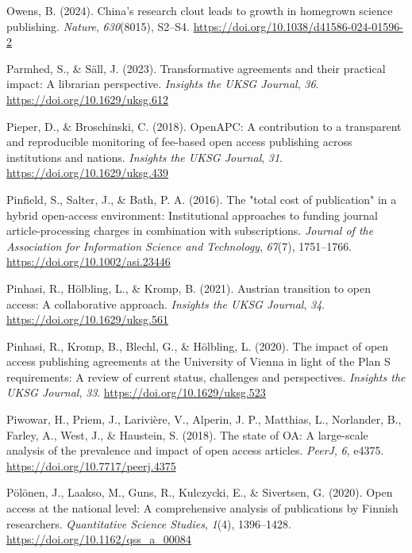 \documentclass[a4paper,man,floatsintext,longtable,noextraspace,12pt]{apa6}
\newlength{\cslhangindent}
\newenvironment{CSLReferences}[2] %
  {\begin{list}{}{%
   \setlength{\itemindent}{0pt}
   \setlength{\leftmargin}{0pt}
   \setlength{\parsep}{0pt}
   \ifodd #1
    \setlength{\leftmargin}{\cslhangindent}
    \setlength{\itemindent}{-1\cslhangindent}
   \fi
   \setlength{\itemsep}{#2\baselineskip}}}
  {\end{list}}
\begin{document}
\begin{CSLReferences}{1}{0}
Owens, B. (2024). China's research clout leads to growth in homegrown
science publishing. \emph{Nature}, \emph{630}(8015), S2--S4.
\url{https://doi.org/10.1038/d41586-024-01596-2}

Parmhed, S., \& Säll, J. (2023). Transformative agreements and their
practical impact: A librarian perspective. \emph{Insights the UKSG
Journal}, \emph{36}. \url{https://doi.org/10.1629/uksg.612}

Pieper, D., \& Broschinski, C. (2018). {OpenAPC}: A contribution to a
transparent and reproducible monitoring of fee-based open access
publishing across institutions and nations. \emph{Insights the {UKSG}
Journal}, \emph{31}. \url{https://doi.org/10.1629/uksg.439}

Pinfield, S., Salter, J., \& Bath, P. A. (2016). The "total cost of
publication" in a hybrid open-access environment: Institutional
approaches to funding journal article-processing charges in combination
with subscriptions. \emph{Journal of the Association for Information
Science and Technology}, \emph{67}(7), 1751--1766.
\url{https://doi.org/10.1002/asi.23446}

Pinhasi, R., Hölbling, L., \& Kromp, B. (2021). Austrian transition to
open access: A collaborative approach. \emph{Insights the UKSG Journal},
\emph{34}. \url{https://doi.org/10.1629/uksg.561}

Pinhasi, R., Kromp, B., Blechl, G., \& Hölbling, L. (2020). The impact
of open access publishing agreements at the {University of Vienna} in
light of the {Plan S} requirements: A review of current status,
challenges and perspectives. \emph{Insights the UKSG Journal},
\emph{33}. \url{https://doi.org/10.1629/uksg.523}

Piwowar, H., Priem, J., Larivière, V., Alperin, J. P., Matthias, L.,
Norlander, B., Farley, A., West, J., \& Haustein, S. (2018). The state
of {OA}: A large-scale analysis of the prevalence and impact of open
access articles. \emph{{PeerJ}}, \emph{6}, e4375.
\url{https://doi.org/10.7717/peerj.4375}

Pölönen, J., Laakso, M., Guns, R., Kulczycki, E., \& Sivertsen, G.
(2020). Open access at the national level: A comprehensive analysis of
publications by {Finnish} researchers. \emph{Quantitative Science
Studies}, \emph{1}(4), 1396--1428.
\url{https://doi.org/10.1162/qss_a_00084}


\end{CSLReferences}
\end{document}

